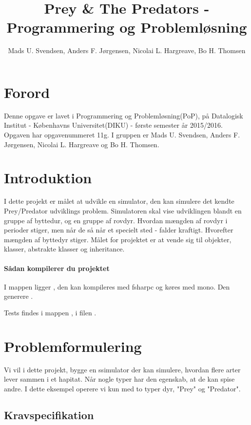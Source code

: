 \documentclass[a4paper]{article}
\title{Prey \& The Predators - Programmering og Problemløsning}
\author{Mads U. Svendsen, Anders F. Jørgensen, Nicolai L. Hargreave, Bo H. Thomsen}
\begin{document}
	\maketitle
  \tableofcontents
\section{Forord}
  Denne opgave er lavet i Programmering og Problemløsning(PoP),
    på Datalogisk Institut - Københavns Universitet(DIKU) - første semester år 2015/2016.
    Opgaven har opgavenummeret 11g.
    I gruppen er Mads U. Svendsen, Anders F. Jørgensen, Nicolai L. Hargreave og Bo H. Thomsen.
\newpage
    
\section{Introduktion} \label{sec:introduction}
   I dette projekt er målet at udvikle en simulator,
   den kan simulere det kendte Prey/Predator udviklings problem.
   Simulatoren skal vise udviklingen blandt en gruppe af byttedur, 
   og en gruppe af rovdyr. Hvordan mængden af rovdyr i perioder stiger,
   men når de så når et specielt sted - falder kraftigt. Hvorefter mængden af byttedyr stiger.
   Målet for projektet er at vende sig til objekter, klasser, abstrakte klasser og inheritance.

  \paragraph*{Sådan kompilerer du projektet\\}
    I  mappen ligger ,
    den kan kompileres med fsharpc og køres med mono.
    Den generere .

    Tests findes i  mappen , i filen .

\section{Problemformulering} \label{sec:problem}
  Vi vil i dette projekt, bygge en ssimulator der kan simulere,
  hvordan flere arter lever sammen i et hapitat.
  Når nogle typer har den egenskab, at de kan spise andre.
  I dette eksempel operere vi kun med to typer dyr, "Prey" og "Predator".

  \subsection{Kravspecifikation} \label{ssec:demands}
    
\end{document}
